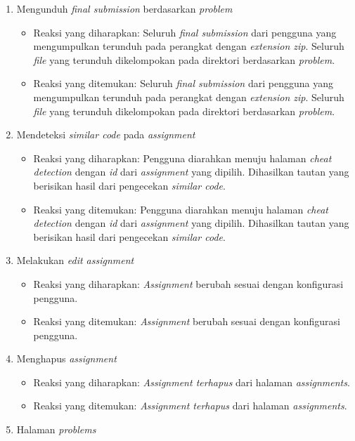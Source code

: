 \begin{enumerate}
\begin{itemize}
	 \end{itemize}
	 \item Mengunduh \textit{final submission} berdasarkan \textit{problem}
	 \begin{itemize}
	 	\item Reaksi yang diharapkan: Seluruh \textit{final submission} dari pengguna yang mengumpulkan terunduh pada perangkat dengan \textit{extension zip}. Seluruh \textit{file} yang terunduh dikelompokan pada direktori berdasarkan \textit{problem}.
	 	\item Reaksi yang ditemukan: Seluruh \textit{final submission} dari pengguna yang mengumpulkan terunduh pada perangkat dengan \textit{extension zip}. Seluruh \textit{file} yang terunduh dikelompokan pada direktori berdasarkan \textit{problem}.
	 \end{itemize}
	 \item Mendeteksi \textit{similar code} pada \textit{assignment}
	 \begin{itemize}
	 	\item Reaksi yang diharapkan: Pengguna diarahkan menuju halaman \textit{cheat detection} dengan \textit{id} dari \textit{assignment} yang dipilih. Dihasilkan tautan yang berisikan hasil dari pengecekan \textit{similar code}.
	 	\item Reaksi yang ditemukan: Pengguna diarahkan menuju halaman \textit{cheat detection} dengan \textit{id} dari \textit{assignment} yang dipilih. Dihasilkan tautan yang berisikan hasil dari pengecekan \textit{similar code}.
	 \end{itemize}
	 \item Melakukan \textit{edit assignment}
	 \begin{itemize}
	 	\item Reaksi yang diharapkan: \textit{Assignment} berubah sesuai dengan konfigurasi pengguna.
	 	\item Reaksi yang ditemukan: \textit{Assignment} berubah sesuai dengan konfigurasi pengguna.
	 \end{itemize}
	 \item Menghapus \textit{assignment}
	 \begin{itemize}
	 	\item Reaksi yang diharapkan: \textit{Assignment terhapus} dari halaman \textit{assignments}.
	 	\item Reaksi yang ditemukan: \textit{Assignment terhapus} dari halaman \textit{assignments}.
	 \end{itemize}
	 \item Halaman \textit{problems}

\end{enumerate}
